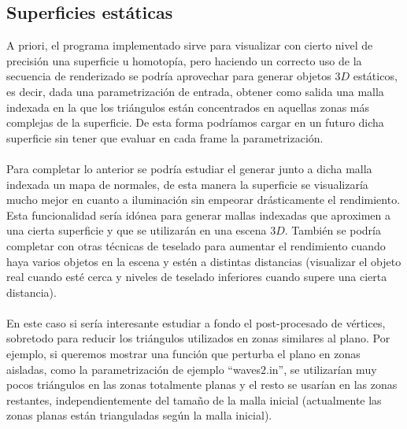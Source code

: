 \subsection*{Superficies estáticas}
A priori, el programa implementado sirve para visualizar con cierto nivel de precisión una superficie u homotopía, pero haciendo un correcto uso de la secuencia de renderizado se podría aprovechar para generar objetos $3D$ estáticos, es decir, dada una parametrización de entrada, obtener como salida una malla indexada en la que los triángulos están concentrados en aquellas zonas más complejas de la superficie. De esta forma podríamos cargar en un futuro dicha superficie sin tener que evaluar en cada frame la parametrización.\\
\\Para completar lo anterior se podría estudiar el generar junto a dicha malla indexada un mapa de normales, de esta manera la superficie se visualizaría mucho mejor en cuanto a iluminación sin empeorar drásticamente el rendimiento. Esta funcionalidad sería idónea para generar mallas indexadas que aproximen a una cierta superficie y que se utilizarán en una escena $3D$. También se podría completar con otras técnicas de teselado para aumentar el rendimiento cuando haya varios objetos en la escena y estén a distintas distancias (visualizar el objeto real cuando esté cerca y niveles de teselado inferiores cuando supere una cierta distancia).\\
\\En este caso si sería interesante estudiar a fondo el post-procesado de vértices, sobretodo para reducir los triángulos utilizados en zonas similares al plano. Por ejemplo, si queremos mostrar una función que perturba el plano en zonas aisladas, como la parametrización de ejemplo ``waves$2$.in'', se utilizarían muy pocos triángulos en las zonas totalmente planas y el resto se usarían en las zonas restantes, independientemente del tamaño de la malla inicial (actualmente las zonas planas están trianguladas según la malla inicial).

\endinput
